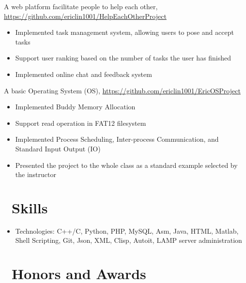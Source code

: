 \documentclass{resume}
\begin{document}
A web platform facilitate people to help each other, \url{https://github.com/ericlin1001/HelpEachOtherProject}
\begin{itemize}
	\item Implemented task management system, allowing users to pose and accept tasks
\item Support user ranking based on the number of tasks the user has finished
\item Implemented online chat and feedback system
\end{itemize}
A basic Operating System (OS), \url{https://github.com/ericlin1001/EricOSProject}
\begin{itemize}
	\item Implemented Buddy Memory Allocation
	\item Support read operation in FAT12 filesystem 
	\item Implemented Process Scheduling, Inter-process Communication, and Standard Input Output (IO)
	\item Presented the project to the whole class as a standard example selected by the instructor
\end{itemize}



\section{\faCogs\ Skills}
\begin{itemize}[parsep=0.5ex]
	\item Technologies: C++/C, Python, PHP, MySQL, Asm, Java, HTML, Matlab, Shell Scripting, Git, Json, XML, Clisp, Autoit, LAMP server administration
\end{itemize}

\section{\faHeartO\ Honors and Awards}
\end{document}
